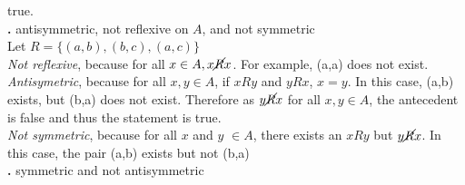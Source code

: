 \documentclass[a4paper,11pt]{article}
\begin{document}
  true.\\
\newpage
  \setcounter{SubsectionCounter}{3}
  \noindent\textbf{.}
  antisymmetric, not reflexive on \(A\), and not symmetric\\
     Let \(R = \{{(a,b),{(b,c)},{(a,c)}}\}\)\\
     \textit{Not reflexive}, because for all \(x \in A, x \cancel{R} x\). For example, {(a,a)} does not exist.\\
\textit{Antisymetric}, because for all \(x,y \in A\), if \(xRy\) and \(y R x\), \(x=y\). In this case, {(a,b)} exists, but (b,a) does not exist. Therefore as \(y \cancel{R} x\) for all \(x,y \in A\), the antecedent is false and thus the statement is 
true.\\
  \textit{Not symmetric}, because for all \(x\) and \(y\) \(\in A\), there exists an \(xRy\) but \(y\cancel{R}x\). In this case, the pair {(a,b)} exists but not 
  {(b,a)}\\
  \setcounter{SubsectionCounter}{4}
\textbf{.}
  symmetric and not antisymmetric\\
\end{document}
